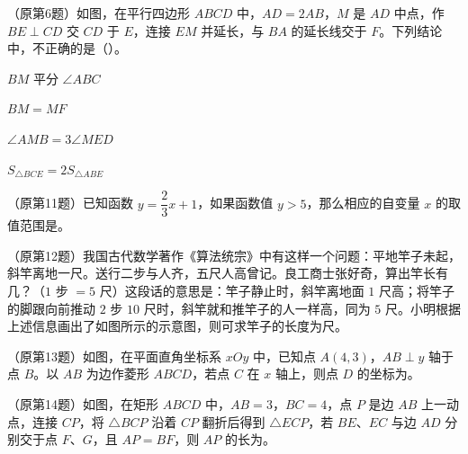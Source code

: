 \documentclass{exam-zh}
\begin{document}
\begin{question}[points=4]
  （原第6题）如图，在平行四边形 $ABCD$ 中，$AD=2AB$，$M$ 是 $AD$ 中点，作 $BE\perp CD$ 交 $CD$ 于 $E$，连接 $EM$ 并延长，与 $BA$ 的延长线交于 $F$。下列结论中，不正确的是（\quad）。
  \begin{choices}
    \item $BM$ 平分 $\angle ABC$
    \item $BM=MF$
    \item $\angle AMB=3\angle MED$
    \item $S_{\triangle BCE}=2S_{\triangle ABE}$
  \end{choices}
\end{question}



\begin{question}[points=4]
  （原第11题）已知函数 $y=\dfrac{2}{3}x+1$，如果函数值 $y>5$，那么相应的自变量 $x$ 的取值范围是\underline{\hspace{32mm}}。
\end{question}



\begin{question}[points=4]
  （原第12题）我国古代数学著作《算法统宗》中有这样一个问题：平地竿子未起，斜竿离地一尺。送行二步与人齐，五尺人高曾记。良工商士张好奇，算出竿长有几？（$1$ 步 $=5$ 尺）这段话的意思是：竿子静止时，斜竿离地面 $1$ 尺高；将竿子的脚跟向前推动 $2$ 步 $10$ 尺时，斜竿就和推竿子的人一样高，同为 $5$ 尺。小明根据上述信息画出了如图所示的示意图，则可求竿子的长度为\underline{\hspace{28mm}}尺。
\end{question}



\begin{question}[points=4]
  （原第13题）如图，在平面直角坐标系 $xOy$ 中，已知点 $A(4,3)$，$AB\perp y$ 轴于点 $B$。以 $AB$ 为边作菱形 $ABCD$，若点 $C$ 在 $x$ 轴上，则点 $D$ 的坐标为\underline{\hspace{36mm}}。
\end{question}



\begin{question}[points=4]
  （原第14题）如图，在矩形 $ABCD$ 中，$AB=3$，$BC=4$，点 $P$ 是边 $AB$ 上一动点，连接 $CP$，将 $\triangle BCP$ 沿着 $CP$ 翻折后得到 $\triangle ECP$，若 $BE$、$EC$ 与边 $AD$ 分别交于点 $F$、$G$，且 $AP=BF$，则 $AP$ 的长为\underline{\hspace{28mm}}。
\end{question}
\end{document}
